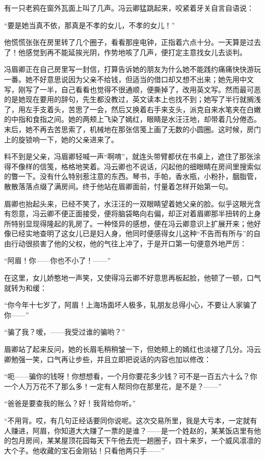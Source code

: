 \par 有一只老鸦在窗外瓦面上叫了几声。冯云卿猛跳起来，咬紧着牙关自言自语说：
\par “要是她当真不依，那真是不孝的女儿，不孝的女儿！”
\par 他慌慌张张在房里转了几个圈子，看看那座电钟，正指着六点十分。一天算是过去了！他感觉到再不能延挨光阴，作势地咳了几声，便打定主意找女儿去谈判。
\par 冯眉卿正在自己房里写一封信，打算告诉她的朋友为什么她不能践约痛痛快快游玩一番。她不好意思说因为父亲不给钱，但适当的借口却又想不出来；她先用中文写，刚写了一半，自己看看也觉得不很通顺，便撕掉了，改用英文写。然而最可恶的是她现在要用的辞句，先生都没教过，英文读本上也找不到；她写了半行就搁浅了，用左手支着头，苦思了一会，然后又换着右手来支头，派克自来水笔夹在白嫩的中指和食指之间。她的两颊上飞染了嫣红，眼睛是水汪汪地，却带着几分倦态。末后，她不再去苦思索了，机械地在那张信笺上画了无数的小圆圈。这时候，房门上的旋锁响一下，她的父亲进来了。
\par 料不到是父亲，冯眉卿轻喊一声“啊唷”，就连头带臂都伏在书桌上，遮住了那张涂得不像样的信笺，格格地笑着。冯云卿也不说话，闪起他的细眼睛在房间里搜索似的瞥一下。没有什么特别惹注意的东西。琴书，手帕，香水瓶，小粉扑，胭脂管，散散落落点缀了满房间。终于他站在眉卿面前，忖量着怎样开始第一句。
\par 眉卿也抬起头来，已经不笑了，水汪汪的一双眼睛望着她父亲的脸。似乎这眼光含有怨意，冯云卿不便正面接受，便将脑袋略向右偏，却正对着眉卿那半扭转的上身所特别显现得隆起的乳房了。一种怪异的感想，便在冯云卿意识上扩展开来；他好像已经实地查明了这女儿已是妇人身，他同时便感得女儿这种“不告而有所与”的自由行动很损害了他的父权，他的气往上冲了，于是开口第一句便意外地严厉：
\par “阿眉！你——你也不小了！——”
\par 在这里，女儿娇憨地一声笑，又使得冯云卿不好意思再板起脸，他顿了一顿，口气就转为和缓：
\par “你今年十七岁了，阿眉！上海场面坏人极多，轧朋友总得小心，不要让人家骗了你——”
\par “骗了我？嗳，——我受过谁的骗哟？”
\par 眉卿站了起来反问，她的长眉毛稍稍皱一下，但她颊上的嫣红也淡褪了几分。冯云卿勉强一笑，口气再让步些，并且立即把说话的内容也加以修改：
\par “呃——骗你的钱呀！你想想看，一个月你要花多少钱？可不是一百五六十么？你一个人万万花不了那么多！一定有人帮同你在那里花，是不是？——”
\par “爸爸是要查我的账么？好！我背给你听。”
\par “不用背。哎，有几句正经话要同你说呢。这次交易所里，我是大亏本，一定就有人赚进，阿眉，你知道大大赚了一票的是谁？——是一个姓赵的，某某饭店里有他的包月房间，某某屋顶花园每天下午他去兜一趟圈子，四十来岁，一个威风凛凛的大个子。他收藏的宝石金刚钻！只看他两只手——”
